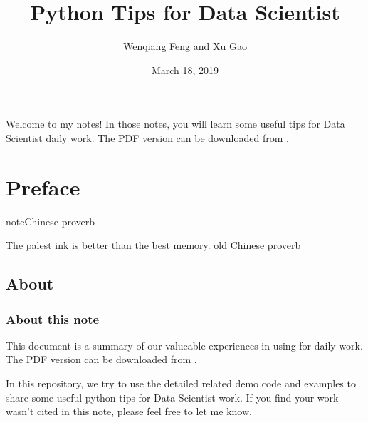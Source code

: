 \documentclass[letterpaper,12pt,english]{sphinxmanual}
\title{Python Tips for Data Scientist}
\date{March 18, 2019}
\author{Wenqiang Feng and Xu Gao}
\begin{document}
\pagestyle{empty}
\sphinxmaketitle
\pagestyle{plain}
\sphinxtableofcontents
\pagestyle{normal}
\label{\detokenize{index::doc}}\begin{quote}

\begin{figure}[htbp]
\centering

\noindent{}
\end{figure}
\end{quote}

Welcome to my  notes! In those notes, you will learn some useful tips for Data Scientist daily work. The PDF version can be downloaded from .




\chapter{Preface}
\label{\detokenize{preface:preface}}\label{\detokenize{preface:id1}}\label{\detokenize{preface::doc}}
\begin{sphinxadmonition}{note}{Chinese proverb}

The palest ink is better than the best memory. \textendash{} old Chinese proverb
\end{sphinxadmonition}


\section{About}
\label{\detokenize{preface:about}}

\subsection{About this note}
\label{\detokenize{preface:about-this-note}}
This document is a summary of our valueable experiences in using 
for  daily work. The PDF version can be downloaded from .


In this repository, we try to use the detailed  related demo code and
examples to share some useful python tips for Data Scientist work. If you
find your work wasn’t cited in this note, please feel free to let me know.
\end{document}
